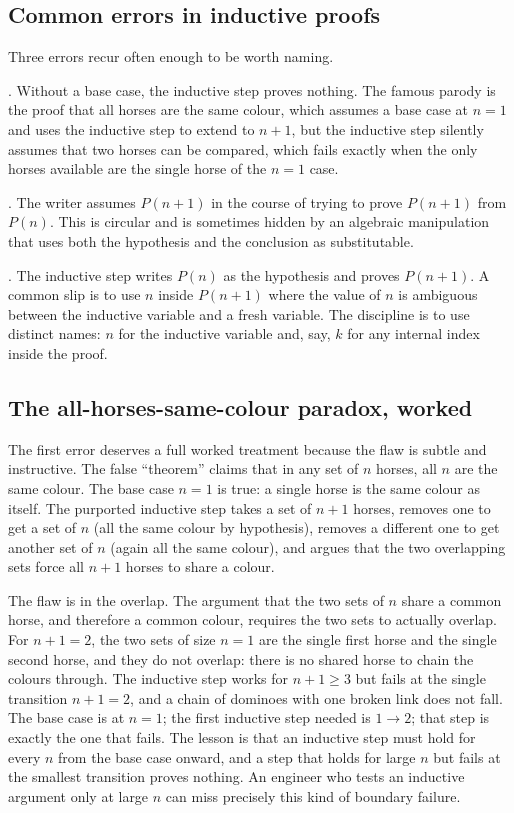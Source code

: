 \subsection{Common errors in inductive proofs}

Three errors recur often enough to be worth naming.

. Without a base case, the inductive
step proves nothing. The famous parody is the proof that all horses
are the same colour, which assumes a base case at $n = 1$ and uses
the inductive step to extend to $n+1$, but the inductive step
silently assumes that two horses can be compared, which fails
exactly when the only horses available are the single horse of the
$n = 1$ case.

. The writer
assumes $P(n+1)$ in the course of trying to prove $P(n+1)$ from
$P(n)$. This is circular and is sometimes hidden by an algebraic
manipulation that uses both the hypothesis and the conclusion as
substitutable.

. The inductive
step writes $P(n)$ as the hypothesis and proves $P(n+1)$. A common
slip is to use $n$ inside $P(n+1)$ where the value of $n$ is
ambiguous between the inductive variable and a fresh variable. The
discipline is to use distinct names: $n$ for the inductive variable
and, say, $k$ for any internal index inside the proof.

\subsection{The all-horses-same-colour paradox, worked}

The first error deserves a full worked treatment because the flaw is
subtle and instructive. The false ``theorem'' claims that in any set
of $n$ horses, all $n$ are the same colour. The base case $n = 1$ is
true: a single horse is the same colour as itself. The purported
inductive step takes a set of $n + 1$ horses, removes one to get a set
of $n$ (all the same colour by hypothesis), removes a different one to
get another set of $n$ (again all the same colour), and argues that
the two overlapping sets force all $n + 1$ horses to share a colour.

The flaw is in the overlap. The argument that the two sets of $n$
share a common horse, and therefore a common colour, requires the two
sets to actually overlap. For $n + 1 = 2$, the two sets of size
$n = 1$ are the single first horse and the single second horse, and
they do not overlap: there is no shared horse to chain the colours
through. The inductive step works for $n + 1 \geq 3$ but fails at the
single transition $n + 1 = 2$, and a chain of dominoes with one broken
link does not fall. The base case is at $n = 1$; the first inductive
step needed is $1 \to 2$; that step is exactly the one that fails. The
lesson is that an inductive step must hold for every $n$ from the base
case onward, and a step that holds for large $n$ but fails at the
smallest transition proves nothing. An engineer who tests an inductive
argument only at large $n$ can miss precisely this kind of boundary
failure.

